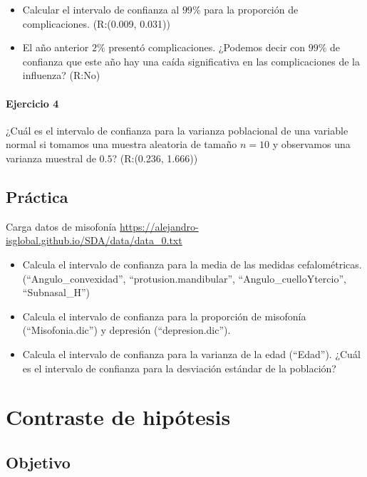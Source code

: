 \documentclass[
]{book}
\begin{document}
\begin{itemize}
\item
  Calcular el intervalo de confianza al \(99\%\) para la proporción de complicaciones. (R:(0.009, 0.031))
\item
  El año anterior \(2\%\) presentó complicaciones. ¿Podemos decir con \(99\%\) de confianza que este año hay una caída significativa en las complicaciones de la influenza? (R:No)
\end{itemize}

\hypertarget{ejercicio-4-4}{%
\subsubsection{Ejercicio 4}\label{ejercicio-4-4}}

¿Cuál es el intervalo de confianza para la varianza poblacional de una variable normal si tomamos una muestra aleatoria de tamaño \(n=10\) y observamos una varianza muestral de \(0.5\)? (R:(0.236, 1.666))

\hypertarget{pruxe1ctica}{%
\section{Práctica}\label{pruxe1ctica}}

Carga datos de misofonía \url{https://alejandro-isglobal.github.io/SDA/data/data_0.txt}

\begin{itemize}
\item
  Calcula el intervalo de confianza para la media de las medidas cefalométricas. (``Angulo\_convexidad'', ``protusion.mandibular'', ``Angulo\_cuelloYtercio'', ``Subnasal\_H'')
\item
  Calcula el intervalo de confianza para la proporción de misofonía (``Misofonia.dic'') y depresión (``depresion.dic'').
\item
  Calcula el intervalo de confianza para la varianza de la edad (``Edad''). ¿Cuál es el intervalo de confianza para la desviación estándar de la población?
\end{itemize}

\hypertarget{contraste-de-hipuxf3tesis}{%
\chapter{Contraste de hipótesis}\label{contraste-de-hipuxf3tesis}}

\hypertarget{objetivo-10}{%
\section{Objetivo}\label{objetivo-10}}
\end{document}
